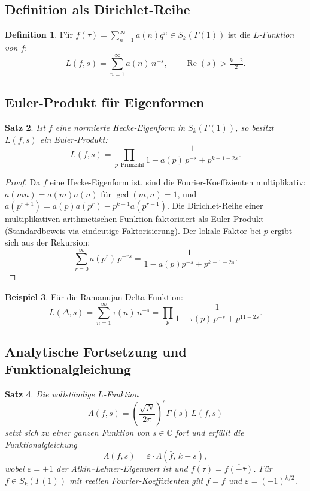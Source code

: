 \documentclass[12pt,a4paper]{amsart}
\newtheorem{theorem}{Satz}[section]
\theoremstyle{definition}
\newtheorem{definition}[theorem]{Definition}
\newtheorem{beispiel}[theorem]{Beispiel}
\begin{document}
\subsection{Definition als Dirichlet-Reihe}

\begin{definition}
  F\"ur $f(\tau) = \sum_{n=1}^{\infty} a(n)q^n \in S_k(\Gamma(1))$ ist die
  \emph{$L$-Funktion von $f$}:
  \[
    L(f,s) = \sum_{n=1}^{\infty} a(n)\,n^{-s}, \qquad \operatorname{Re}(s) > \tfrac{k+2}{2}.
  \]
\end{definition}

\subsection{Euler-Produkt f\"ur Eigenformen}

\begin{theorem}\label{thm:euler-produkt}
  Ist $f$ eine normierte Hecke-Eigenform in $S_k(\Gamma(1))$, so besitzt
  $L(f,s)$ ein Euler-Produkt:
  \[
    L(f,s) = \prod_{p\,\text{ Primzahl}} \frac{1}{1 - a(p)\,p^{-s} + p^{k-1-2s}}.
  \]
\end{theorem}

\begin{proof}
  Da $f$ eine Hecke-Eigenform ist, sind die Fourier-Koeffizienten multiplikativ:
  $a(mn) = a(m)a(n)$ f\"ur $\gcd(m,n)=1$, und $a(p^{r+1}) = a(p)a(p^r) - p^{k-1}a(p^{r-1})$.
  Die Dirichlet-Reihe einer multiplikativen arithmetischen Funktion faktorisiert
  als Euler-Produkt (Standardbeweis via eindeutige Faktorisierung). Der lokale
  Faktor bei $p$ ergibt sich aus der Rekursion:
  \[
    \sum_{r=0}^{\infty} a(p^r)\, p^{-rs}
    = \frac{1}{1 - a(p)p^{-s} + p^{k-1-2s}}.
  \]
\end{proof}

\begin{beispiel}
  F\"ur die Ramanujan-Delta-Funktion:
  \[
    L(\Delta,s) = \sum_{n=1}^{\infty}\tau(n)\,n^{-s}
    = \prod_p \frac{1}{1 - \tau(p)\,p^{-s} + p^{11-2s}}.
  \]
\end{beispiel}

\subsection{Analytische Fortsetzung und Funktionalgleichung}

\begin{theorem}
  Die vollst\"andige $L$-Funktion
  \[
    \Lambda(f,s) = \left(\frac{\sqrt{N}}{2\pi}\right)^s \Gamma(s)\,L(f,s)
  \]
  setzt sich zu einer ganzen Funktion von $s \in \mathbb{C}$ fort und erf\"ullt
  die Funktionalgleichung
  \[
    \Lambda(f,s) = \varepsilon \cdot \Lambda(\bar{f},\,k-s),
  \]
  wobei $\varepsilon = \pm 1$ der Atkin--Lehner-Eigenwert ist und
  $\bar{f}(\tau) = \overline{f(-\bar{\tau})}$.
  F\"ur $f \in S_k(\Gamma(1))$ mit reellen Fourier-Koeffizienten gilt
  $\bar{f} = f$ und $\varepsilon = (-1)^{k/2}$.
\end{theorem}
\end{document}
